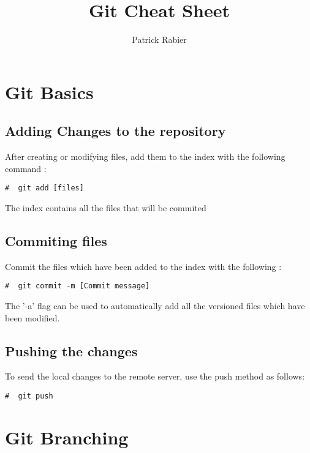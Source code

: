 \documentclass{article}
\title{Git Cheat Sheet}
\author{Patrick Rabier}
\begin{document}
\maketitle


\section{Git Basics}

\subsection{Adding Changes to the repository}
After creating or modifying files, add them to the index with the following command :
\begin{lstlisting}[style=BashInputStyle]
    #  git add [files]
\end{lstlisting}

The index contains all the files that will be commited

\subsection{Commiting files}

Commit the files which have been added to the index with the following :

\begin{lstlisting}[style=BashInputStyle]
    #  git commit -m [Commit message]
\end{lstlisting}

The '-a' flag can be used to automatically add all the versioned files which have been modified.

\subsection{Pushing the changes}

To send the local changes to the remote server, use the push method as follows: 

\begin{lstlisting}[style=BashInputStyle]
    #  git push
\end{lstlisting}


\section{Git Branching}
\end{document}
